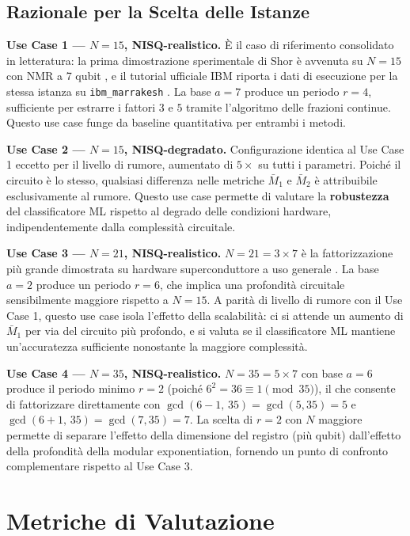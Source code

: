 \begin{onehalfspace}
\subsection{Razionale per la Scelta delle Istanze}

\textbf{Use Case 1 --- $N=15$, NISQ-realistico.}
È il caso di riferimento consolidato in letteratura: la prima dimostrazione sperimentale di Shor è avvenuta su $N=15$ con NMR a 7 qubit \cite{vandersypen2001}, e il tutorial ufficiale IBM riporta i dati di esecuzione per la stessa istanza su \texttt{ibm\_marrakesh} \cite{ibm_shor_tutorial}. La base $a=7$ produce un periodo $r=4$, sufficiente per estrarre i fattori $3$ e $5$ tramite l'algoritmo delle frazioni continue. Questo use case funge da baseline quantitativa per entrambi i metodi.

\textbf{Use Case 2 --- $N=15$, NISQ-degradato.}
Configurazione identica al Use Case 1 eccetto per il livello di rumore, aumentato di $5\times$ su tutti i parametri. Poiché il circuito è lo stesso, qualsiasi differenza nelle metriche $\bar{M}_1$ e $\bar{M}_2$ è attribuibile esclusivamente al rumore. Questo use case permette di valutare la \textbf{robustezza} del classificatore ML rispetto al degrado delle condizioni hardware, indipendentemente dalla complessità circuitale.

\textbf{Use Case 3 --- $N=21$, NISQ-realistico.}
$N = 21 = 3 \times 7$ è la fattorizzazione più grande dimostrata su hardware superconduttore a uso generale \cite{skosana2021}. La base $a=2$ produce un periodo $r=6$, che implica una profondità circuitale sensibilmente maggiore rispetto a $N=15$. A parità di livello di rumore con il Use Case 1, questo use case isola l'effetto della scalabilità: ci si attende un aumento di $\bar{M}_1$ per via del circuito più profondo, e si valuta se il classificatore ML mantiene un'accuratezza sufficiente nonostante la maggiore complessità.

\textbf{Use Case 4 --- $N=35$, NISQ-realistico.}
$N = 35 = 5 \times 7$ con base $a=6$ produce il periodo minimo $r=2$ (poiché $6^2 = 36 \equiv 1 \pmod{35}$), il che consente di fattorizzare direttamente con $\gcd(6-1,\, 35) = \gcd(5, 35) = 5$ e $\gcd(6+1,\, 35) = \gcd(7, 35) = 7$. La scelta di $r=2$ con $N$ maggiore permette di separare l'effetto della dimensione del registro (più qubit) dall'effetto della profondità della modular exponentiation, fornendo un punto di confronto complementare rispetto al Use Case 3.

\section{Metriche di Valutazione}
\label{sec:metriche}


\end{onehalfspace}
